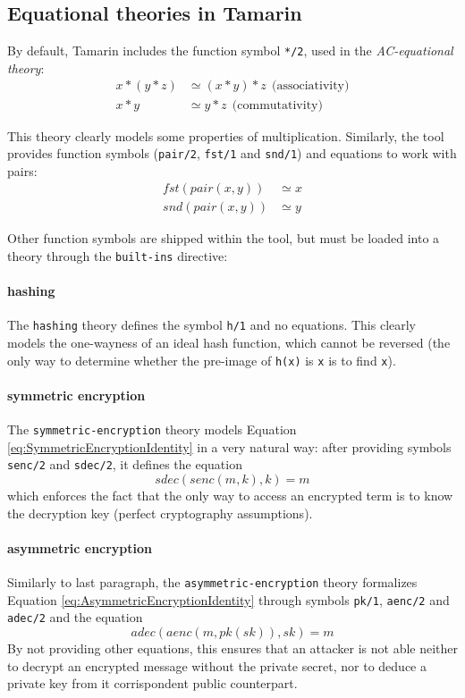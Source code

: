 \documentclass[fleqn,10pt]{SelfArx} %
\begin{document}
\subsection{Equational theories in Tamarin}

By default, Tamarin includes the function symbol \lstinline|*/2|, used in the \textit{AC-equational theory}:
\begin{align*}
    x * (y * z) &\simeq (x * y) * z\ \ \textrm{(associativity)}\\
    x * y &\simeq y * z\ \ \textrm{(commutativity)}
\end{align*}

This theory clearly models some properties of multiplication. Similarly, the tool provides function symbols (\lstinline|pair/2|, \lstinline|fst/1| and \lstinline|snd/1|) and equations to work with pairs: 
\begin{align*}
    fst(pair(x,y)) &\simeq x\\
    snd(pair(x,y)) &\simeq y
\end{align*}

Other function symbols are shipped within the tool, but must be loaded into a theory through the \lstinline|built-ins| directive:

\paragraph{hashing}
The \lstinline|hashing| theory defines the symbol \lstinline|h/1| and no equations. This clearly models the one-wayness of an ideal hash function, which cannot be reversed (the only way to determine whether the pre-image of \lstinline|h(x)| is \lstinline|x| is to find \lstinline|x|).

\paragraph{symmetric encryption}
The \lstinline|symmetric-encryption| theory models Equation \ref{eq:SymmetricEncryptionIdentity} in a very natural way: after providing symbols \lstinline|senc/2| and \lstinline|sdec/2|, it defines the equation
\begin{equation*}
    sdec(senc(m,k),k) = m
\end{equation*}
which enforces the fact that the only way to access an encrypted term is to know the decryption key (perfect cryptography assumptions).

\paragraph{asymmetric encryption}
Similarly to last paragraph, the \lstinline|asymmetric-encryption| theory formalizes Equation \ref{eq:AsymmetricEncryptionIdentity} through symbols \lstinline|pk/1|, \lstinline|aenc/2| and \lstinline|adec/2| and the equation
\begin{equation*}
    adec(aenc(m, pk(sk)), sk) = m
\end{equation*}
By not providing other equations, this ensures that an attacker is not able neither to decrypt an encrypted message without the private secret, nor to deduce a private key from it corrispondent public counterpart.
\end{document}
